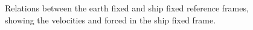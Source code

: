 \begin{figure}[h]
    \centering
    
    \caption{Relations between the earth fixed and ship fixed reference frames, showing the velocities and forced in the ship fixed frame.}
    \label{fig:reference_frames}
\end{figure}

